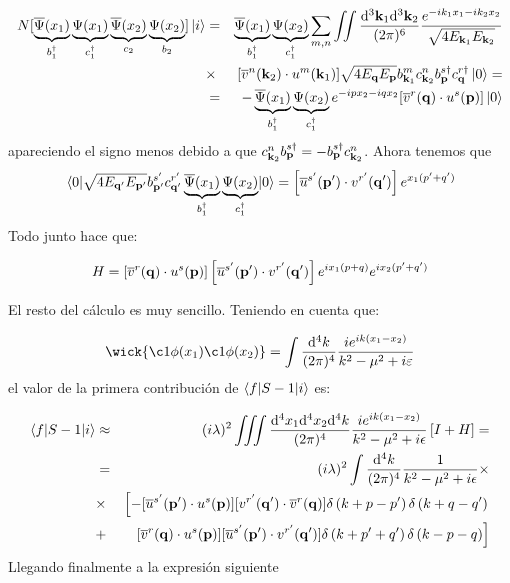 \begin{solucion}
\begin{itemize}
		\begin{eqnarray*}			
			N[\underbrace{ \overline{\Psi} (x_1)}_{b^\dagger_1}\underbrace{ \Psi (x_1)}_{c^\dagger_1}  \underbrace{ \overline{\Psi} 	(x_2)}_{c_2} \underbrace{ \Psi (x_2)}_{b_2}] \ket{i} & = &\underbrace{ \overline{\Psi} (x_1)}_{b^\dagger_1}\underbrace{ \Psi (x_2)}_{c^\dagger_1}  \sum_{m,n} \iint \frac{\mathrm{d}^3 \mathbf{k}_1 \mathrm{d}^3 \mathbf{k}_2}{(2\pi)^6} \frac{e^{-i k_1 x_1 - i k_2 x_2}}{\sqrt{4E_{\mathbf{k}_1}E_{\mathbf{k}_2}}}  \\ & \times & [\overline{v}^n(\mathbf{k}_2) \cdot u^m(\mathbf{k}_1)] \sqrt{4E_{\mathbf{q}} E_{\mathbf{p}}} b_{\mathbf{k}_1}^m c_{\mathbf{k}_2}^n b_{\mathbf{p}}^{s\dagger} c_ {\mathbf{q}}^{r \dagger}  \ket{0} =  \\
			& = & -\underbrace{ \overline{\Psi} (x_1)}_{b^\dagger_1}\underbrace{ \Psi (x_2)}_{c^\dagger_1}  e^{-i p x_2 - i q x_2} [\overline{v}^r(\mathbf{q}) \cdot u^s(\mathbf{p})]  \ket{0}  
		\end{eqnarray*}
		apareciendo el signo menos debido a que $c_{\mathbf{k}_2}^n b_{\mathbf{p}}^{s\dagger}=- b_{\mathbf{p}}^{s\dagger}c_{\mathbf{k}_2}^n$. Ahora tenemos que 
		\begin{eqnarray*}
			\mel{0}{ \sqrt{4E_{\mathbf{q}'} E_{\mathbf{p}'}} b_{\mathbf{p}'}^{s'} c_{\mathbf{q}'}^{r'} \underbrace{ \overline{\Psi}(x_1)}_{b^\dagger_1}\underbrace{ \Psi (x_2)}_{c^\dagger_1} }{0} =
			\left[ \overline{u}^{s'}(\mathbf{p}') \cdot v^{r'}(\mathbf{q}') \right] e^{x_1 (p'+q')}
		\end{eqnarray*}
		Todo junto hace que:
		
		\begin{equation*}
			H = \left[ \overline{v}^{r}(\mathbf{q}) \cdot u^{s}(\mathbf{p}) \right] \left[ \overline{u}^{s'}(\mathbf{p}') \cdot v^{r'}(\mathbf{q}') \right]e^{ix_1(p+q)}e^{ix_2(p'+q')}
		\end{equation*}
	\end{itemize}
	El resto del cálculo es muy sencillo. Teniendo en cuenta que:
	
	\begin{equation*}
		\wick{\c1{\phi}(x_1)\c1{\phi} (x_2)} = \int \frac{\D^4 k}{(2\pi)^4} \frac{ie^{ik(x_1-x_2)}}{k^2 - \mu^2 + i \varepsilon}
	\end{equation*}
	el valor de la primera contribución de $\mel**{f}{S-1}{i} $ es:
	
	\begin{eqnarray*}
		\mel**{f}{S-1}{i}  & \approx & (i\lambda)^2\iiint \frac{\mathrm{d}^4 x_1 \mathrm{d}^4 x_2 \mathrm{d}^4  k}{(2\pi)^4} \frac{ie^{ik(x_1-x_2)}}{k^2 - \mu^2 + i \epsilon}  \left[ I+H \right] = \\
		& = & (i\lambda)^2\int \frac{\mathrm{d}^4  k}{(2\pi)^4} \frac{1}{k^2 - \mu^2 + i \epsilon} \times \\
		& \times &  \left[ - [\overline{u}^{s'}(\mathbf{p}') \cdot u^{s}(\mathbf{p})]  [v^{r'}(\mathbf{q}') \cdot \overline{v}^{r}(\mathbf{q})] \delta \left( k+p-p' \right)\delta \left( k+q-q' \right) \right. \\
		& + & \left.  [\overline{v}^{r}(\mathbf{q}) \cdot u^{s}(\mathbf{p})] [\overline{u}^{s'}(\mathbf{p}') \cdot v^{r'}(\mathbf{q}')] \delta \left( k+p'+q' \right)\delta \left( k-p-q \right) \right]
	\end{eqnarray*}	
	Llegando finalmente a la expresión siguiente
	

\end{solucion}
